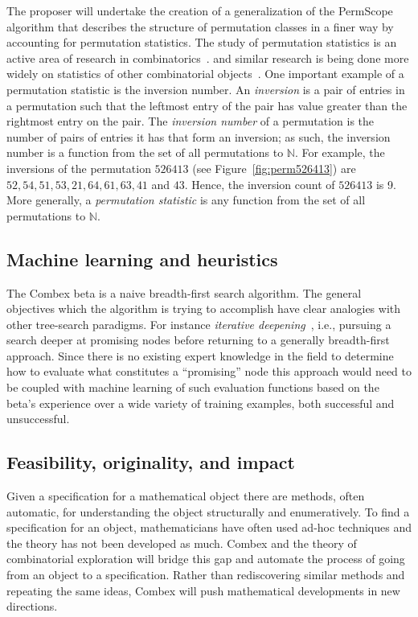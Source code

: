 \documentclass{rannis}
\newcommand{\motheralg}{\textsf{Combex}}
\newcommand{\tilealg}{\textsf{PermScope}}
\theoremstyle{definition}
\begin{document}
The proposer will undertake the creation
of a generalization of the \tilealg{} algorithm that describes the structure of permutation
classes in a finer way by accounting for permutation statistics.
The study of permutation statistics is an active area of research in
combinatorics~\cite{bukata2019statisitics, dokos2012statistics,
babson2000vincular,branden2011meshpattern}.
and similar research is being done more widely on
statistics of other combinatorial objects~\cite{findstat, MR4011551, MR4109929}.
One important example of a
permutation statistic is the inversion number. An \emph{inversion} is a pair of
entries in a permutation such that the leftmost entry of the pair has value
greater than the rightmost entry on the pair. The \emph{inversion number} of a
permutation is the number of pairs of entries it has that form an inversion;
as such, the
inversion number is a function from the set of all permutations to $\mathbb{N}$.
For example, the inversions of the permutation $526413$
(see Figure~\ref{fig:perm526413}) are $52, 54,51,53,21,64,61,63,41$ and $43$.
Hence, the inversion count of $526413$ is 9.
More generally, a \emph{permutation statistic} is any function from the set of
all permutations to $\mathbb{N}$.


\subsection*{Machine learning and heuristics}
The \motheralg{} beta is a naive breadth-first search algorithm. The
general objectives which the algorithm is trying to accomplish have clear
analogies with other tree-search paradigms. For instance
\emph{iterative deepening}~\cite{KORF198597,russell2002artificial},
i.e., pursuing a search deeper at promising nodes
before returning to a generally breadth-first approach. Since there is no
existing expert knowledge in the field to determine how to evaluate what
constitutes a ``promising'' node this approach would need to be coupled with
machine learning of such evaluation functions based on the beta's
experience over a wide variety of training examples, both successful and
unsuccessful.

\subsection*{Feasibility, originality, and impact}
Given a
specification for a mathematical object there are methods, often automatic, for
understanding the object structurally and enumeratively.
To find a
specification for an object, mathematicians have often
used ad-hoc techniques and the theory has not been developed as much.
\motheralg{} and the theory of combinatorial exploration will bridge this gap
and automate the process of going from an object to a
specification. Rather than rediscovering similar methods and repeating the same
ideas, \motheralg{} will push mathematical developments in new directions.
\end{document}

